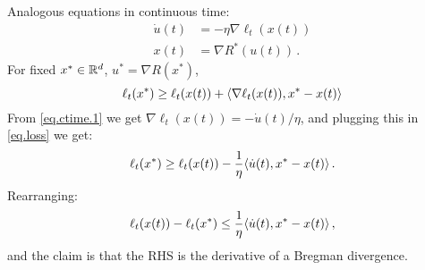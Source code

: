 \documentclass[12pt]{report}
\theoremstyle{plain}
\theoremstyle{definition}
\theoremstyle{remark}
\begin{document}
Analogous equations in continuous time:
\begin{align*}
\dot{u}(t) &= - \eta \nabla \ell_{t}(x(t)) \label{eq.ctime.1} \tag{1ct} \\
x(t) &= \nabla R^{*}(u(t))\,. \label{eq.ctime.2} \tag{2ct}
\end{align*}
For fixed $x^{*} \in \mathbb{R}^d$, $u^{*} = \nabla R(x^{*})$,
\setcounter{equation}{3}
\begin{equation}
\ell_{t}(x^{*}) \geq \ell_{t}(x(t)) + \langle {\nabla\ell_t(x(t)), x^{*} - x(t)}\rangle \label{eq.loss}
\end{equation}
From \eqref{eq.ctime.1} we get $\nabla \ell_{t}(x(t)) = -\dot{u}(t)/\eta$,
and plugging this in \eqref{eq.loss} we get:
\[
\ell_{t}(x^{*}) \geq \ell_{t}(x(t)) - \frac{1}{\eta} \langle {\dot{u}(t), x^{*} - x(t)}\rangle\,.
\]
Rearranging:
\begin{equation}
\ell_{t}(x(t)) - \ell_{t}(x^{*}) \leq  \frac{1}{\eta} \langle {\dot{u}(t), x^{*} - x(t)}\rangle\,, \label{eq.loss.prep}
\end{equation}
and the claim is that the RHS is the derivative of a Bregman divergence.

\bigskip
\end{document}
